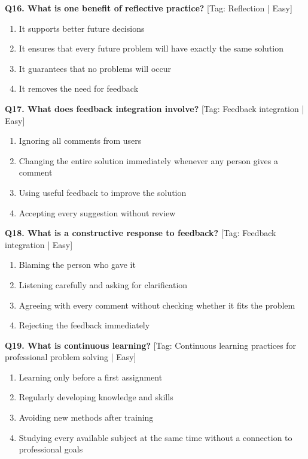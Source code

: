 \noindent\textbf{Q16. What is one benefit of reflective practice?} \hfill [Tag: Reflection | Easy]
\begin{enumerate}[label=(\alph*),topsep=2pt,itemsep=1pt,partopsep=0pt,parsep=0pt]
    \item {It supports better future decisions}
    \item {It ensures that every future problem will have exactly the same solution}
    \item {It guarantees that no problems will occur}
    \item {It removes the need for feedback}
\end{enumerate}
\vspace{2mm}

\noindent\textbf{Q17. What does feedback integration involve?} \hfill [Tag: Feedback integration | Easy]
\begin{enumerate}[label=(\alph*),topsep=2pt,itemsep=1pt,partopsep=0pt,parsep=0pt]
    \item {Ignoring all comments from users}
    \item {Changing the entire solution immediately whenever any person gives a comment}
    \item {Using useful feedback to improve the solution}
    \item {Accepting every suggestion without review}
\end{enumerate}
\vspace{2mm}

\noindent\textbf{Q18. What is a constructive response to feedback?} \hfill [Tag: Feedback integration | Easy]
\begin{enumerate}[label=(\alph*),topsep=2pt,itemsep=1pt,partopsep=0pt,parsep=0pt]
    \item {Blaming the person who gave it}
    \item {Listening carefully and asking for clarification}
    \item {Agreeing with every comment without checking whether it fits the problem}
    \item {Rejecting the feedback immediately}
\end{enumerate}
\vspace{2mm}

\noindent\textbf{Q19. What is continuous learning?} \hfill [Tag: Continuous learning practices for professional problem solving | Easy]
\begin{enumerate}[label=(\alph*),topsep=2pt,itemsep=1pt,partopsep=0pt,parsep=0pt]
    \item {Learning only before a first assignment}
    \item {Regularly developing knowledge and skills}
    \item {Avoiding new methods after training}
    \item {Studying every available subject at the same time without a connection to professional goals}
\end{enumerate}
\vspace{2mm}

